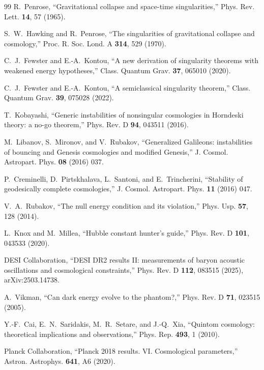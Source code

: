 \documentclass[11pt,letterpaper]{article}
\begin{document}
\begin{thebibliography}{99}
 R.~Penrose, ``Gravitational collapse and space-time singularities,'' Phys. Rev. Lett. \textbf{14}, 57 (1965).

 S.~W.~Hawking and R.~Penrose, ``The singularities of gravitational collapse and cosmology,'' Proc. R. Soc. Lond. A \textbf{314}, 529 (1970).

 C.~J.~Fewster and E.-A.~Kontou, ``A new derivation of singularity theorems with weakened energy hypotheses,'' Class. Quantum Grav. \textbf{37}, 065010 (2020).

 C.~J.~Fewster and E.-A.~Kontou, ``A semiclassical singularity theorem,'' Class. Quantum Grav. \textbf{39}, 075028 (2022).

 T.~Kobayashi, ``Generic instabilities of nonsingular cosmologies in Horndeski theory: a no-go theorem,'' Phys. Rev. D \textbf{94}, 043511 (2016).

 M.~Libanov, S.~Mironov, and V.~Rubakov, ``Generalized Galileons: instabilities of bouncing and Genesis cosmologies and modified Genesis,'' J. Cosmol. Astropart. Phys. \textbf{08} (2016) 037.

 P.~Creminelli, D.~Pirtskhalava, L.~Santoni, and E.~Trincherini, ``Stability of geodesically complete cosmologies,'' J. Cosmol. Astropart. Phys. \textbf{11} (2016) 047.

 V.~A.~Rubakov, ``The null energy condition and its violation,'' Phys. Usp. \textbf{57}, 128 (2014).

 L.~Knox and M.~Millea, ``Hubble constant hunter's guide,'' Phys. Rev. D \textbf{101}, 043533 (2020).

 DESI Collaboration, ``DESI DR2 results II: measurements of baryon acoustic oscillations and cosmological constraints,'' Phys. Rev. D \textbf{112}, 083515 (2025), arXiv:2503.14738.

 A.~Vikman, ``Can dark energy evolve to the phantom?,'' Phys. Rev. D \textbf{71}, 023515 (2005).

 Y.-F.~Cai, E.~N.~Saridakis, M.~R.~Setare, and J.-Q.~Xia, ``Quintom cosmology: theoretical implications and observations,'' Phys. Rep. \textbf{493}, 1 (2010).

 Planck Collaboration, ``Planck 2018 results. VI. Cosmological parameters,'' Astron. Astrophys. \textbf{641}, A6 (2020).


\end{thebibliography}
\end{document}
